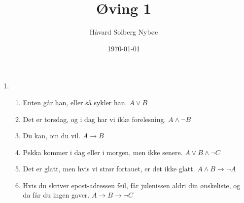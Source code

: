 \documentclass[a4paper, 12pt]{article}  %
\title{Øving 1}                         %
\author{Håvard Solberg Nybøe}           %
\date{\today}                           %
\begin{document}
\maketitle


\begin{enumerate}
    \item [\boxed{1}]
    \begin{enumerate}
        \item Enten går han, eller så sykler han. \(A \lor B\)
        \item Det er torsdag, og i dag har vi ikke forelesning. \(A \land \neg B\)
        \item Du kan, om du vil. \(A \to B\)
        \item Pekka kommer i dag eller i morgen, men ikke senere. \(A \lor B \land \neg C\)
        \item Det er glatt, men hvis vi strør fortauet, er det ikke glatt. \(A \land B \to \neg A\)
        \item Hvis du skriver epost-adressen feil, får julenissen aldri din ønskeliste, og da får du ingen gaver. \(A \to B \to \neg C\)
    \end{enumerate}
\end{enumerate}

\end{document}
